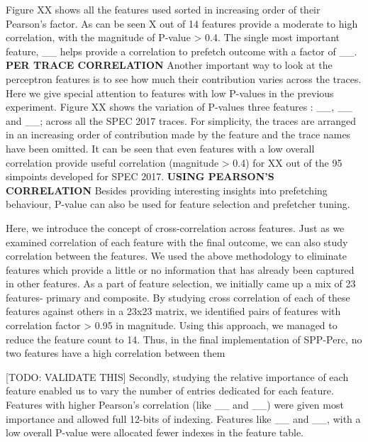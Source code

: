 \documentclass{sig-alternate}
\begin{document}
Figure XX shows all the features used sorted in increasing order of their Pearson's factor.
As can be seen X out of 14 features provide a moderate to high correlation, with the magnitude of P-value > 0.4.
The single most important feature, \_\_ helps provide a correlation to prefetch outcome with a factor of \_\_.
\newline \newline
\textbf{PER TRACE CORRELATION} \newline
Another important way to look at the perceptron features is to see how much their contribution varies across the traces.
Here we give special attention to features with low P-values in the previous experiment.
Figure XX shows the variation of P-values three features : \_\_, \_\_ and \_\_; across all the SPEC 2017 traces.
For simplicity, the traces are arranged in an increasing order of contribution made by the feature and the trace names have been omitted.
It can be seen that even features with a low overall correlation provide useful correlation (magnitude > 0.4) for XX out of the 95 simpoints developed for SPEC 2017.
\newline \newline
\textbf{USING PEARSON'S CORRELATION} \newline
Besides providing interesting insights into prefetching behaviour, P-value can also be used for feature selection and prefetcher tuning.

Here, we introduce the concept of cross-correlation across features.
Just as we examined correlation of each feature with the final outcome, we can also study correlation between the features.
We used the above methodology to eliminate features which provide a little or no information that has already been captured in other features.
As a part of feature selection, we initially came up a mix of 23 features- primary and composite.
By studying cross correlation of each of these features against others in a 23x23 matrix, we identified pairs of features with correlation factor > 0.95 in magnitude.
Using this approach, we managed to reduce the feature count to 14.
Thus, in the final implementation of SPP-Perc, no two features have a high correlation between them

[TODO: VALIDATE THIS] Secondly, studying the relative importance of each feature enabled us to vary the number of entries dedicated for each feature.
Features with higher Pearson's correlation (like \_\_ and \_\_) were given most importance and allowed full 12-bits of indexing.
Features like \_\_ and \_\_, with a low overall P-value were allocated fewer indexes in the feature table.
\end{document}

